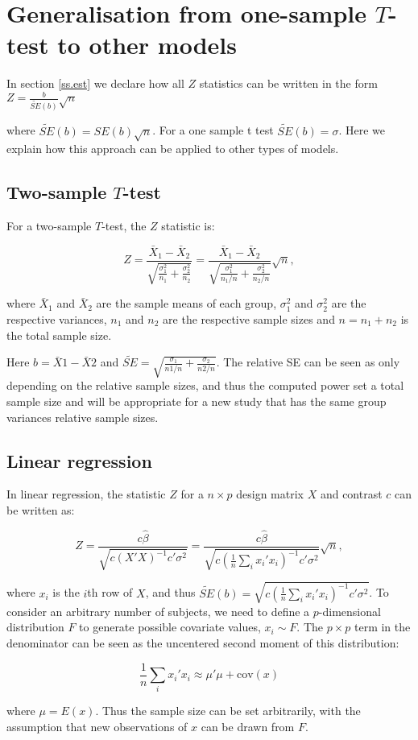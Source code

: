 \section{Generalisation from one-sample $T$-test to other models \label{App.generalisation}}

In section \ref{ss.est} we declare how all $Z$ statistics can be written in the form $Z =\frac{ b }{ \widetilde{SE}(b)} \sqrt{n}$

where $\widetilde{SE}(b) = SE(b) \sqrt{n}$.  For a one sample t test $\widetilde{SE}(b) = \sigma$.  Here we explain how this approach can be applied to other types of models.

\subsection{Two-sample $T$-test}

For a two-sample $T$-test, the $Z$ statistic is:

$$
Z = \frac{\bar{X}_1 - \bar{X}_2}{\sqrt{\frac{\sigma_1^2}{n_1} +\frac{\sigma_2^2}{n_2}}} = \frac{\bar{X}_1 - \bar{X}_2}{\sqrt{\frac{\sigma_1^2}{n_1/n} +\frac{\sigma_2^2}{n_2/n}}}\sqrt{n},
$$

where $\bar{X}_1$ and $\bar{X}_2$ are the sample means of each group, $\sigma_1^2$ and $\sigma_2^2$ are the respective variances, $n_1$ and $n_2$ are the respective sample sizes and $n =n_1+n_2$ is the total sample size.

Here $b=\bar{X}1-\bar{X}2$ and $\widetilde{SE} = \sqrt{\frac{\sigma_1}{n1/n}+\frac{\sigma_2}{n2/n}}$.  The relative SE can be seen as only depending on the relative sample sizes, and thus the computed power set a total sample size and will be appropriate for a new study that has the same group variances relative sample sizes.

\subsection{Linear regression}

In linear regression, the statistic $Z$ for a $n \times p$ design matrix $X$ and contrast $c$ can be written as:

$$
Z = \frac{c\hat\beta}{\sqrt{c(X'X)^{-1}c'\sigma^2}} = \frac{c\hat\beta}{\sqrt{c(\frac{1}{n}\sum_ix_i'x_i)^{-1}c'\sigma^2}}\sqrt{n},
$$

where $x_i$ is the $i$th row of $X$, and thus $\widetilde{SE}(b) = \sqrt{c(\frac{1}{n}\sum_ix_i'x_i)^{-1}c'\sigma^2}$.  To consider an arbitrary number of subjects, we need to define a $p$-dimensional distribution $F$ to generate possible covariate values, $x_i \sim F$.  The
$p \times p$ term in the denominator can be seen as the uncentered second moment of this distribution:

$$
\frac{1}{n}\sum_i x_i'x_i \approx \mu'\mu+\text{cov}(x)
$$

where $\mu=E(x)$.  Thus the sample size can be set arbitrarily, with the assumption that new observations of $x$ can be drawn from $F$.
